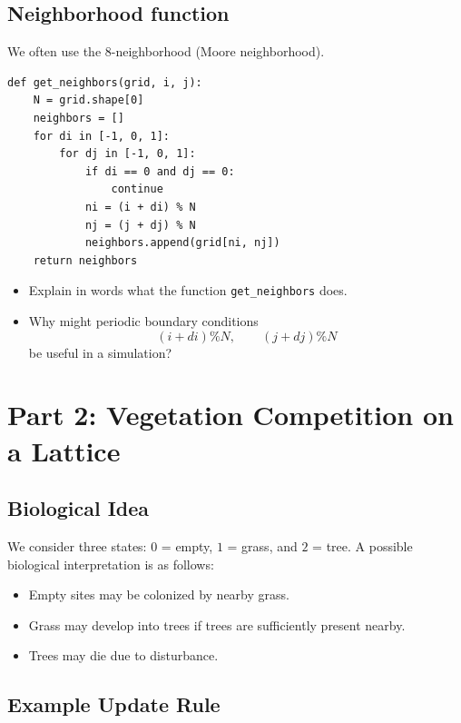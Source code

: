 \documentclass[paper=letter, fontsize=12pt]{article}
\numberwithin{equation}{section}
\begin{document}
\subsection*{Neighborhood function}

We often use the 8-neighborhood (Moore neighborhood).
\begin{lstlisting}
def get_neighbors(grid, i, j):
    N = grid.shape[0]
    neighbors = []
    for di in [-1, 0, 1]:
        for dj in [-1, 0, 1]:
            if di == 0 and dj == 0:
                continue
            ni = (i + di) % N
            nj = (j + dj) % N
            neighbors.append(grid[ni, nj])
    return neighbors
\end{lstlisting}

\begin{taskbox}
\begin{itemize}
\item Explain in words what the function \texttt{get\_neighbors} does.
\item Why might periodic boundary conditions
\[
(i+di)\%N,\qquad (j+dj)\%N
\]
be useful in a simulation?
\end{itemize}
\end{taskbox}

\section*{Part 2: Vegetation Competition on a Lattice}

\subsection*{Biological Idea}

We consider three states: $0$ = empty, $1$ = grass, and $2$ = tree. A possible biological interpretation is as follows:
\begin{itemize}
\item Empty sites may be colonized by nearby grass.
\item Grass may develop into trees if trees are sufficiently present nearby.
\item Trees may die due to disturbance.
\end{itemize}

\subsection*{Example Update Rule}
\end{document}
